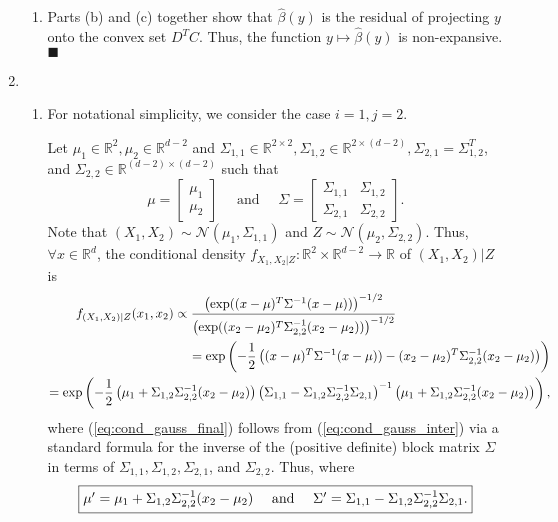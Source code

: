 \documentclass[11pt]{article}
\renewcommand{\qed}{\quad \ensuremath{\blacksquare}}
\newcommand{\inv}{^{-1}}
\newcommand{\R}{\mathbb{R}} %
\renewcommand{\hat}{\widehat}
\begin{document}
\begin{enumerate}
\begin{enumerate}
\item Parts (b) and (c) together show that $\hat\beta(y)$ is the residual of
projecting $y$ onto the convex set $D^T C$. Thus, the function
$y \mapsto \hat\beta(y)$ is non-expansive. \qed

\end{enumerate}

\newpage
\item
\begin{enumerate}
\item For notational simplicity, we consider the case $i = 1, j = 2$.

Let $\mu_1 \in \R^2, \mu_2 \in \R^{d - 2}$ and
$\Sigma_{1,1} \in \R^{2 \times 2}, \Sigma_{1,2} \in \R^{2 \times (d - 2)},
\Sigma_{2,1} = \Sigma_{1,2}^T$, and
$\Sigma_{2,2} \in \R^{(d - 2) \times (d - 2)}$ such that
\[\mu =
    \begin{bmatrix}
        \mu_1 \\
        \mu_2
    \end{bmatrix}
    \quad \mbox{ and } \quad
    \Sigma =
    \begin{bmatrix}
        \Sigma_{1,1} & \Sigma_{1,2} \\
        \Sigma_{2,1} & \Sigma_{2,2}
    \end{bmatrix}.
\]
Note that $(X_1,X_2) \sim \mathcal{N}(\mu_1,\Sigma_{1,1})$ and
$Z \sim \mathcal{N}(\mu_2, \Sigma_{2,2})$. Thus, $\forall x \in \R^d$, the
conditional density $f_{X_1,X_2|Z} : \R^2 \times \R^{d - 2} \to \R$ of
$(X_1,X_2) | Z$ is
\begin{align}
\notag
f_{(X_1,X_2)|Z}(x_1,x_2)
    \propto \frac{\left(
        \exp((x - \mu)^T \Sigma\inv (x - \mu))\right)^{-1/2}}
        {\left(
        \exp((x_2 - \mu_2)^T \Sigma_{2,2}\inv (x_2 - \mu_2)) \right)^{-1/2}}
        \hspace{42mm}\\
\label{eq:cond_gauss_inter}
    = \exp\left( -\frac{1}{2} \left(
        (x - \mu)^T \Sigma\inv (x - \mu)) - 
        (x_2 - \mu_2)^T \Sigma_{2,2}\inv (x_2 - \mu_2) \right) \right) \\
\label{eq:cond_gauss_final}
    = \exp\left( -\frac{1}{2} \left( \mu_1 + \Sigma_{1,2}\Sigma_{2,2}\inv (x_2 - \mu_2) \right)
        \left( \Sigma_{1,1} - \Sigma_{1,2}\Sigma_{2,2}\inv\Sigma_{2,1} \right)\inv
        \left( \mu_1 + \Sigma_{1,2}\Sigma_{2,2}\inv (x_2 - \mu_2) \right) \right),
\end{align}
where (\ref{eq:cond_gauss_final}) follows from (\ref{eq:cond_gauss_inter}) via
a standard formula for the inverse of the (positive definite) block matrix
$\Sigma$ in terms of $\Sigma_{1,1},\Sigma_{1,2},\Sigma_{2,1}$, and
$\Sigma_{2,2}$. Thus,
 where
\[\mbox{\fbox{$\mu' = \mu_1 + \Sigma_{1,2}\Sigma_{2,2}\inv (x_2 - \mu_2)
    \quad \mbox{ and } \quad
    \Sigma' = \Sigma_{1,1} - \Sigma_{1,2}\Sigma_{2,2}\inv\Sigma_{2,1}$.}}\]


\end{enumerate}
\end{enumerate}
\end{document}
